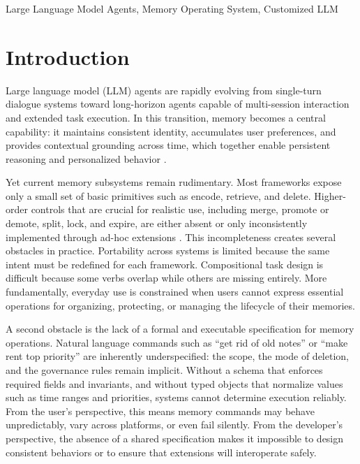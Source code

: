 \documentclass[conference]{IEEEtran}
\begin{document}
\begin{IEEEkeywords}
Large Language Model Agents, Memory Operating System, Customized LLM
\end{IEEEkeywords}

\section{Introduction}

Large language model (LLM) agents\cite{Zhao2025LLMSurvey,Wang2024AgentSurvey,Luo2025LLMAgentSurvey} are rapidly evolving from single-turn dialogue systems toward long-horizon agents capable of multi-session interaction and extended task execution. In this transition, memory becomes a central capability: it maintains consistent identity, accumulates user preferences, and provides contextual grounding across time, which together enable persistent reasoning and personalized behavior \cite{Yang2024Memory3,Wei2025SecondMe,li2025memos}.  

Yet current memory subsystems remain rudimentary. Most frameworks expose only a small set of basic primitives such as encode, retrieve, and delete. Higher-order controls that are crucial for realistic use, including merge, promote or demote, split, lock, and expire, are either absent or only inconsistently implemented through ad-hoc extensions \cite{Packer2024MemGPT,Chhikara2025Mem0}. This incompleteness creates several obstacles in practice. Portability across systems is limited because the same intent must be redefined for each framework. Compositional task design is difficult because some verbs overlap while others are missing entirely. More fundamentally, everyday use is constrained when users cannot express essential operations for organizing, protecting, or managing the lifecycle of their memories.  

A second obstacle is the lack of a formal and executable specification for memory operations. Natural language commands such as “get rid of old notes” or “make rent top priority” are inherently underspecified: the scope, the mode of deletion, and the governance rules remain implicit. Without a schema that enforces required fields and invariants, and without typed objects that normalize values such as time ranges and priorities, systems cannot determine execution reliably. From the user’s perspective, this means memory commands may behave unpredictably, vary across platforms, or even fail silently. From the developer’s perspective, the absence of a shared specification makes it impossible to design consistent behaviors or to ensure that extensions will interoperate safely.  
\end{document}
